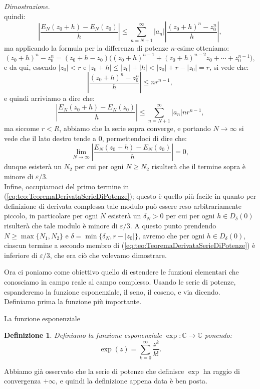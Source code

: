 \documentclass[11pt]{book}
\makeatletter
\theoremstyle{Definizione}
\newtheorem*{mydef}{Definizione}
\theoremstyle{TeoremaProposizioneLemmaCorollarioCongettura}
\theoremstyle{OsservazioneNotaEsempio}
\renewenvironment{proof}[1][\proofname]{\par
  \normalfont \topsep6\p@\@plus6\p@\relax
  \trivlist
  \item[\hskip\labelsep
        \itshape
    #1\@addpunct{.}]\ignorespaces
}{%
  \endtrivlist\@endpefalse
}
\renewenvironment{proof}{\textsl{Dimostrazione}.}{}
\newcommand{\C}{\mathbb{C}}
\newcommand{\Disc}[3][]{D^{#1}_{{#2}}({#3})}
\makeatother
\begin{document}
\begin{boxteo}{}
\begin{proof}
$$$$
quindi:
$$
\left|\frac{E_N(z_0+h)-E_N(z_0)}{h}\right| \leq \sum_{n = N+1}^{\infty} |a_n| \left|\frac{(z_0+h)^n-z_0^n}{h}\right|,
$$
ma applicando la formula per la differenza di potenze $n$-esime otteniamo:
$$
(z_0+h)^n-z_0^n = (z_0+h-z_0)\big((z_0+h)^{n-1}+(z_0+h)^{n-2}z_0+\cdots+z_0^{n-1}\big),
$$
e da qui, essendo $|z_0| < r$ e $|z_0+h|\leq |z_0|+|h| < |z_0| + r-|z_0| = r$, si vede che:
$$
\left|\frac{(z_0+h)^n-z_0^n}{h}\right| \leq nr^{n-1},
$$
e quindi arriviamo a dire che:
$$
\left|\frac{E_N(z_0+h)-E_N(z_0)}{h}\right| \leq \sum_{n = N+1}^\infty |a_n| n r^{n-1},
$$
ma siccome $r < R$, abbiamo che la serie sopra converge, e portando $N \to \infty$ si vede che il lato destro tende a $0$, permettendoci di dire che:
$$
\lim_{N \to\infty} \left|\frac{E_N(z_0+h)-E_N(z_0)}{h}\right| = 0,
$$
dunque esisterà un $N_2$ per cui per ogni $N \geq N_2$ risulterà che il termine sopra è minore di $\varepsilon/3$.\\
Infine, occupiamoci del primo termine in (\ref{eq:teo:TeoremaDerivataSerieDiPotenze}); questo è quello più facile in quanto per definizione di derivata complessa tale modulo può essere reso arbitrariamente piccolo, in particolare per ogni $N$ esisterà un $\delta_N>0$ per cui per ogni $h\in \Disc{\delta}{0}$ risulterà che tale modulo è minore di $\varepsilon/3$. A questo punto prendendo $N \geq \max\{N_1,N_2\}$ e $\delta = \min\{\delta_N,r-|z_0|\}$, avremo che per ogni $h\in \Disc{\delta}{0}$, ciascun termine a secondo membro di (\ref{eq:teo:TeoremaDerivataSerieDiPotenze}) è inferiore di $\varepsilon/3$, che era ciò che volevamo dimostrare.
\end{proof}
\end{boxteo}
\noindent
Ora ci poniamo come obiettivo quello di estendere le funzioni elementari che conosciamo in campo reale al campo complesso. Usando le serie di potenze, espanderemo la funzione esponenziale, il seno, il coseno, e via dicendo.\\
Definiamo prima la funzione più importante.
\begin{boxdef}{La funzione esponenziale}
\begin{mydef}
Definiamo la funzione esponenziale $\exp:\C\longrightarrow \C$ ponendo:
$$
\exp(z) = \sum_{k = 0}^\infty \frac{z^k}{k!}.
$$
\end{mydef}
\end{boxdef}
\noindent
Abbiamo già osservato che la serie di potenze che definisce $\exp$ ha raggio di convergenza $+\infty$, e quindi la definizione appena data è ben posta.
\end{document}
